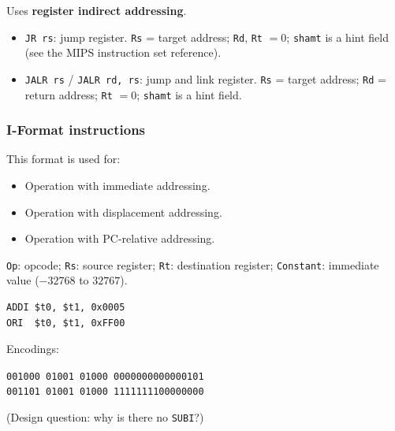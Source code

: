 Uses \textbf{register indirect addressing}.
\begin{itemize}
  \item \texttt{JR rs}: jump register. \texttt{Rs} = target address;
  \texttt{Rd}, \texttt{Rt} $= 0$; \texttt{shamt} is a hint field (see the MIPS instruction set reference).
  \item \texttt{JALR rs} / \texttt{JALR rd, rs}: jump and link register.
  \texttt{Rs} = target address; \texttt{Rd} = return address; \texttt{Rt}
  $=0$; \texttt{shamt} is a hint field.
\end{itemize}

\subsubsection{I-Format instructions}

\begin{center}
\end{center}

This format is used for:
\begin{itemize}
  \item Operation with immediate addressing.
  \item Operation with displacement addressing.
  \item Operation with PC-relative addressing.
\end{itemize}

\begin{eg}
\texttt{Op}: opcode;
\texttt{Rs}: source register; \texttt{Rt}: destination register;
\texttt{Constant}: immediate value ($-32768$ to $32767$).
\begin{lstlisting}
ADDI $t0, $t1, 0x0005
ORI  $t0, $t1, 0xFF00
\end{lstlisting}
Encodings:
\begin{center}
\texttt{001000 01001 01000 0000000000000101}\\
\texttt{001101 01001 01000 1111111100000000}
\end{center}
(Design question: why is there no \texttt{SUBI}?)
\end{eg}

